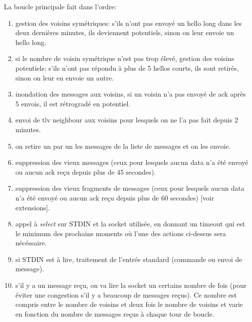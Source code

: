 \documentclass[a4paper,10pt]{article} %
\begin{document}
La boucle principale fait dans l'ordre:
\begin{enumerate}
\item gestion des voisins symétriques: s'ils n'ont pas envoyé un hello long dans les deux dernières minutes, ils deviennent potentiels, sinon on leur envoie un hello long.
\item si le nombre de voisin symétrique n'est pas trop élevé, gestion des voisins potentiels: s'ils n'ont pas répondu à plus de 5 hellos courts, ils sont retirés, sinon on leur en envoie un autre.
\item inondation des messages aux voisins, si un voisin n'a pas envoyé de ack après 5 envois, il est rétrogradé en potentiel.
\item envoi de tlv neighbour aux voisins pour lesquels on ne l'a pas fait depuis 2 minutes.
\item on retire un par un les messages de la liste de messages et on les envoie.
\item suppression des vieux messages (ceux pour lesquels aucun data n'a été envoyé ou aucun ack reçu depuis plus de 45 secondes).
\item suppression des vieux fragments de messages (ceux pour lesquels aucun data n'a été envoyé ou aucun ack reçu depuis plus de 60 secondes) [voir extensions].
\item appel à \textit{select} sur STDIN et la socket utilisée, en donnant un timeout qui est le minimum des prochains moments où l'une des actions ci-dessus sera nécéssaire.
\item si STDIN est à lire, traitement de l'entrée standard (commande ou envoi de message).
\item s'il y a un message reçu, on va lire la socket un certains nombre de fois (pour éviter une congestion s'il y a beaucoup de messages reçus). Ce nombre est compris entre le nombre de voisins et deux fois le nombre de voisins et varie en fonction du nombre de messages reçus à chaque tour de boucle.
\end{enumerate}
\end{document}
